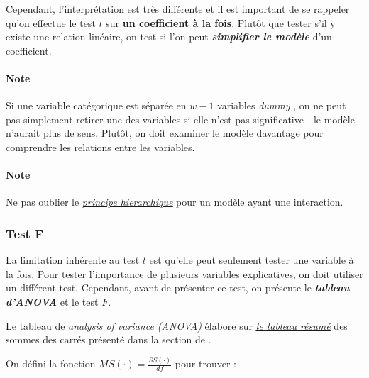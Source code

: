 \documentclass[french]{article}
\begin{document}
\begin{multicols*}{2}
\begin{rappel_enhanced}[Contexte]
\bigskip

Cependant, l'interprétation est très différente et il est important de se rappeler qu'on effectue le test $t$ sur \textbf{un coefficient à la fois}. Plutôt que tester s'il y existe une relation linéaire, on test si l'on peut \textbf{\textit{simplifier le modèle}} d'un coefficient.
\end{rappel_enhanced}

\paragraph{Note}	Si une variable catégorique est séparée en $w - 1$ variables \og \textit{dummy} \fg{}, on ne peut pas simplement retirer une des variables si elle n'est pas significative---le modèle n'aurait plus de sens. Plutôt, on doit examiner le modèle davantage pour comprendre les relations entre les variables.

\paragraph{Note}	Ne pas oublier le \textit{\color{bleudefrance}\underline{\hyperlink{hierachicalPrincipleMLR}{\color{bleudefrance} principe hierarchique}}} pour un modèle ayant une interaction.



\subsubsection{Test F}
\begin{rappel_enhanced}[Contexte]
La limitation inhérente au test $t$ est qu'elle peut seulement tester une variable à la fois. Pour tester l'importance de plusieurs variables explicatives, on doit utiliser un différent test. Cependant, avant de présenter ce test, on présente le \textbf{\textit{tableau d'ANOVA}} et le test $F$.
\end{rappel_enhanced}

\begin{definitionNOHFILL}
Le tableau de \og \textit{analysis of variance (ANOVA)} \fg{} élabore sur \textit{\color{bleudefrance}\underline{\hyperlink{ANOVABefore}{\color{bleudefrance} le tableau résumé}}} des sommes des carrés présenté dans la section de \textit{\underline{}}.

\bigskip

On défini la fonction $MS(\cdot) = \frac{SS(\cdot)}{df}$ pour trouver : 


\end{definitionNOHFILL}
\end{multicols*}
\end{document}
